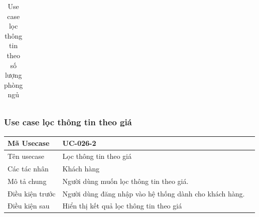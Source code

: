 \documentclass[12pt,a4paper]{article}
\begin{document}
\begin{table}[H]
\begin{tabular}{|p{3.5cm}|p{11.5cm}|c|}
            \\ \hline
        \end{tabular}
        \caption{Use case lọc thông tin theo số lượng phòng ngủ}

    \end{table}



    \subsubsection*{Use case lọc thông tin theo giá}
    \begin{table}[H]
        \centering
        \begin{tabular}{|p{3.5cm}|p{11.5cm}|c|}
            \hline
            Mã Usecase      & UC-026-2                                               \\
            \hline
            Tên usecase     & Lọc thông tin theo giá                                 \\
            \hline
            Các tác nhân    & Khách hàng                                             \\
            \hline
            Mô tả chung     & Người dùng muốn lọc thông tin theo giá.                \\
            \hline

            Điều kiện trước & Người dùng đăng nhập vào hệ thống dành cho khách hàng. \\
            \hline

            Điều kiện sau   & Hiển thị kết quả lọc thông tin theo giá                \\
            \hline


\end{tabular}
\end{table}
\end{document}
